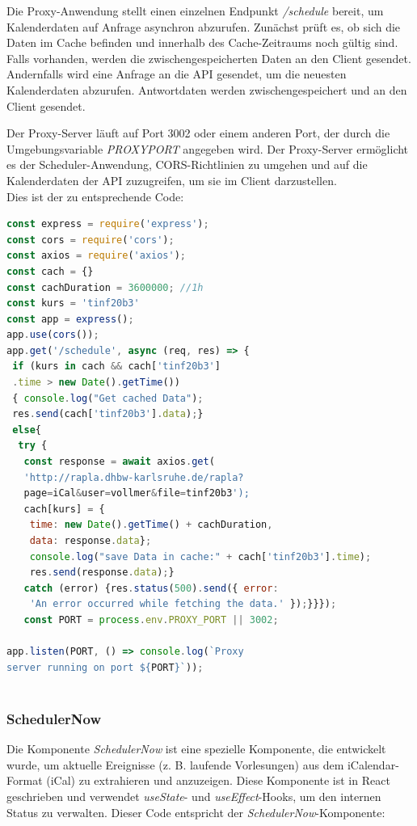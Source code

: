 Die Proxy-Anwendung stellt einen einzelnen Endpunkt \emph{/schedule} bereit, um Kalenderdaten auf Anfrage asynchron abzurufen. Zunächst prüft es, ob sich die Daten im Cache befinden und innerhalb des Cache-Zeitraums noch gültig sind. Falls vorhanden, werden die zwischengespeicherten Daten an den Client gesendet. Andernfalls wird eine Anfrage an die API gesendet, um die neuesten Kalenderdaten abzurufen. Antwortdaten werden zwischengespeichert und an den Client gesendet.

Der Proxy-Server läuft auf Port 3002 oder einem anderen Port, der durch die Umgebungsvariable \emph{PROXYPORT} angegeben wird. Der Proxy-Server ermöglicht es der Scheduler-Anwendung, CORS-Richtlinien zu umgehen und auf die Kalenderdaten der API zuzugreifen, um sie im Client darzustellen.\\
Dies ist der zu entsprechende Code:
\begin{lstlisting}[language=JavaScript,
	frame=single,           % Ein Rahmen um den Code
	framexleftmargin=15pt,  % Rahmen link von den Zahlen
	style=algoBericht,
	label={Proxy-Server},
	captionpos=b ,          % Caption unter den Code setzen
	caption={Proxy-Server}]
const express = require('express');
const cors = require('cors');
const axios = require('axios');
const cach = {}
const cachDuration = 3600000; //1h
const kurs = 'tinf20b3'
const app = express();
app.use(cors());
app.get('/schedule', async (req, res) => {
 if (kurs in cach && cach['tinf20b3']
 .time > new Date().getTime())
 { console.log("Get cached Data");
 res.send(cach['tinf20b3'].data);}
 else{
  try {
   const response = await axios.get(
   'http://rapla.dhbw-karlsruhe.de/rapla?
   page=iCal&user=vollmer&file=tinf20b3');
   cach[kurs] = {
    time: new Date().getTime() + cachDuration,
    data: response.data};
    console.log("save Data in cache:" + cach['tinf20b3'].time);
    res.send(response.data);} 
   catch (error) {res.status(500).send({ error: 
   	'An error occurred while fetching the data.' });}}});
   const PORT = process.env.PROXY_PORT || 3002;

app.listen(PORT, () => console.log(`Proxy 
server running on port ${PORT}`));
	
\end{lstlisting}
\subsubsection{SchedulerNow}
Die Komponente \emph{SchedulerNow} ist eine spezielle Komponente, die entwickelt wurde, um aktuelle Ereignisse (z. B. laufende Vorlesungen) aus dem iCalendar-Format (iCal) zu extrahieren und anzuzeigen. Diese Komponente ist in React geschrieben und verwendet \emph{useState}- und \emph{useEffect}-Hooks, um den internen Status zu verwalten. Dieser Code entspricht der \emph{SchedulerNow}-Komponente:

